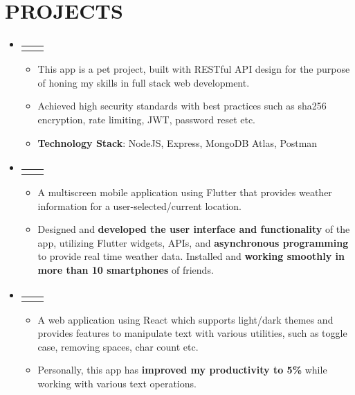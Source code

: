 \documentclass[letterpaper,10pt]{article}
\makeatletter
\newcommand{\myuline}[1]{%
  \uline{\phantom{#1}}%
  \llap{\contour{white}{#1}}%
}
\newcommand{\resumeItem}[1]{
  \item\small{
      {#1 \vspace{-2pt}}
    }
}
\newcommand{\resumeProjectHeading}[2]{
    \item
    \begin{tabular*}{\textwidth}{l@{\extracolsep{\fill}}r}
      #1 & {\color{dark-grey}} \\
    \end{tabular*}\vspace{-4pt}
}
\newcommand{\resumeSubHeadingListStart}{\begin{itemize}[leftmargin=0in, label={}]}
\newcommand{\resumeSubHeadingListEnd}{\end{itemize}}
\newcommand{\resumeItemListStart}{\begin{itemize}}
\newcommand{\resumeItemListEnd}{\end{itemize}\vspace{0pt}}
\makeatother
\begin{document}
\section{PROJECTS}
\resumeSubHeadingListStart
\resumeProjectHeading
{\textbf{\href{https://github.com/Pranav108/natours_node}{\myuline {Natours}}}}{Mar. 2022 -- Present}
\resumeItemListStart
\resumeItem{This app is a pet project, built with RESTful API design for the purpose of honing my skills in full stack web development.}
\resumeItem{Achieved high security standards with best practices such as sha256 encryption, rate limiting, JWT, password reset etc.}
\resumeItem{\textbf{Technology Stack}: NodeJS, Express, MongoDB Atlas, Postman}
\resumeItemListEnd

\resumeProjectHeading
{\textbf{\href{https://github.com/Pranav108/mousam}{\myuline {Mousam App}}}}{Dec. 2020 -- Jan. 2021}
\resumeItemListStart
\resumeItem{A multiscreen mobile application using Flutter that provides weather information for a user-selected/current location.}
\resumeItem{Designed and \textbf{developed the user interface and functionality} of the app, utilizing Flutter widgets, APIs, and \textbf{asynchronous programming} to provide real time weather data. Installed and \textbf{working smoothly in more than 10 smartphones} of friends.}
\resumeItemListEnd

\resumeProjectHeading
{\textbf{\href{https://github.com/Pranav108/text_utils}{\myuline {Text-Utils React App}}}} {Sep. 2021 -- Nov. 2021}
\resumeItemListStart
\resumeItem{A web application using React which supports light/dark themes and provides features to manipulate text with various utilities, such as toggle case, removing spaces, char count etc.}
\resumeItem{Personally, this app has \textbf{improved my productivity to 5\%} while working with various text operations.}
\resumeItemListEnd

\resumeSubHeadingListEnd


\end{document}
